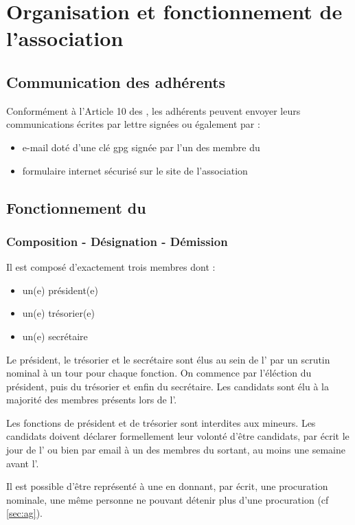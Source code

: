 \documentclass[a4paper,french,10pt]{article}
\begin{document}
\section{Organisation et fonctionnement de l'association}

\subsection{Communication des adhérents}
Conformément à l'Article 10 des \statuts{}, les adhérents peuvent envoyer leurs communications écrites par lettre signées ou également par :
\begin{itemize}
\item e-mail doté d'une clé gpg signée par l'un des membre du \bureau{}
\item formulaire internet sécurisé sur le site de l'association
\end{itemize}


\subsection{Fonctionnement du \bureau{}}

\subsubsection*{Composition - Désignation - Démission}
\label{sec:comp-design}
Il est composé d'exactement trois membres dont :
\begin{itemize}
\item un(e) président(e)
\item un(e) trésorier(e)
\item un(e) secrétaire
\end{itemize}

Le président, le trésorier et le secrétaire sont élus au sein de
l'\AG{} par un scrutin nominal à un tour pour chaque
fonction. On commence par l'éléction du président, puis du trésorier
et enfin du secrétaire.  Les candidats sont élu à la majorité des
membres présents lors de l'\AG{}.

Les fonctions de président et de trésorier sont interdites aux mineurs. Les candidats doivent déclarer
formellement leur volonté d'être candidats, par écrit le jour de l'\AG{}
ou bien par email à un des membres du \bureau{} sortant, au moins une
semaine avant l'\AG{}.


Il est possible d’être représenté à une \AG{} en donnant, par écrit, une procuration nominale, une même personne ne pouvant détenir plus
d’une procuration (cf \ref{sec:ag}).
\end{document}
